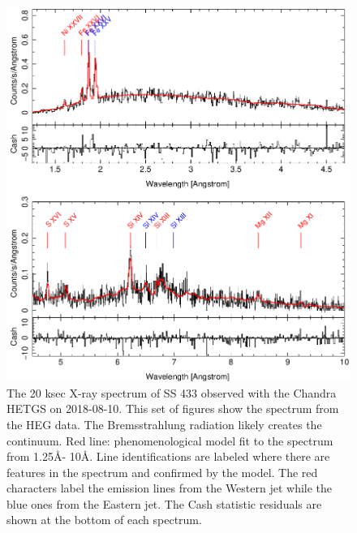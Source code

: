 \begin{figure}[h!]
    \centering
    \includegraphics[width = \linewidth]{Chapters/Figures/short_pheno_heg.png}
    \caption{The 20 ksec X-ray spectrum of SS 433 observed with the Chandra HETGS on 2018-08-10. This set of figures show the spectrum from the HEG data. The Bremsstrahlung radiation likely creates the continuum. Red line: phenomenological model fit to the spectrum from 1.25\AA -  10\AA. Line identifications are labeled where there are features in the spectrum and confirmed by the model. The red characters label the emission lines from the Western jet while the blue ones from the Eastern jet. The Cash statistic residuals are shown at the bottom of each spectrum. }
    \label{shorthegpheno}
\end{figure}




